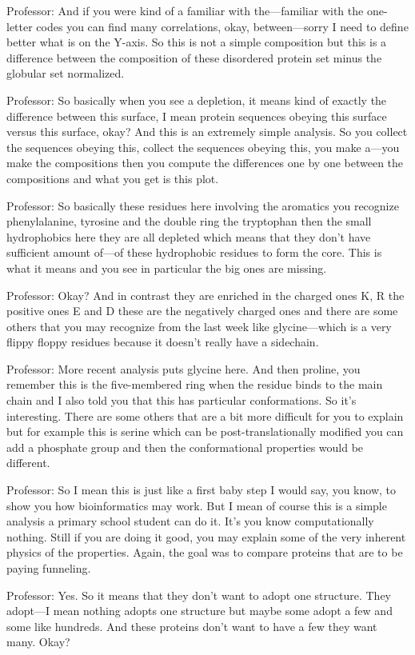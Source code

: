 Professor: And if you were kind of a familiar with the—familiar with the one-letter codes you can find many correlations, okay, between—sorry I need to define better what is on the Y-axis. So this is not a simple composition but this is a difference between the composition of these disordered protein set minus the globular set normalized.

Professor: So basically when you see a depletion, it means kind of exactly the difference between this surface, I mean protein sequences obeying this surface versus this surface, okay? And this is an extremely simple analysis. So you collect the sequences obeying this, collect the sequences obeying this, you make a—you make the compositions then you compute the differences one by one between the compositions and what you get is this plot.

Professor: So basically these residues here involving the aromatics you recognize phenylalanine, tyrosine and the double ring the tryptophan then the small hydrophobics here they are all depleted which means that they don’t have sufficient amount of—of these hydrophobic residues to form the core. This is what it means and you see in particular the big ones are missing.

Professor: Okay? And in contrast they are enriched in the charged ones K, R the positive ones E and D these are the negatively charged ones and there are some others that you may recognize from the last week like glycine—which is a very flippy floppy residues because it doesn’t really have a sidechain.

Professor: More recent analysis puts glycine here. And then proline, you remember this is the five-membered ring when the residue binds to the main chain and I also told you that this has particular conformations. So it’s interesting. There are some others that are a bit more difficult for you to explain but for example this is serine which can be post-translationally modified you can add a phosphate group and then the conformational properties would be different.

Professor: So I mean this is just like a first baby step I would say, you know, to show you how bioinformatics may work. But I mean of course this is a simple analysis a primary school student can do it. It’s you know computationally nothing. Still if you are doing it good, you may explain some of the very inherent physics of the properties. Again, the goal was to compare proteins that are to be paying funneling.

Professor: Yes. So it means that they don’t want to adopt one structure. They adopt—I mean nothing adopts one structure but maybe some adopt a few and some like hundreds. And these proteins don’t want to have a few they want many. Okay?

